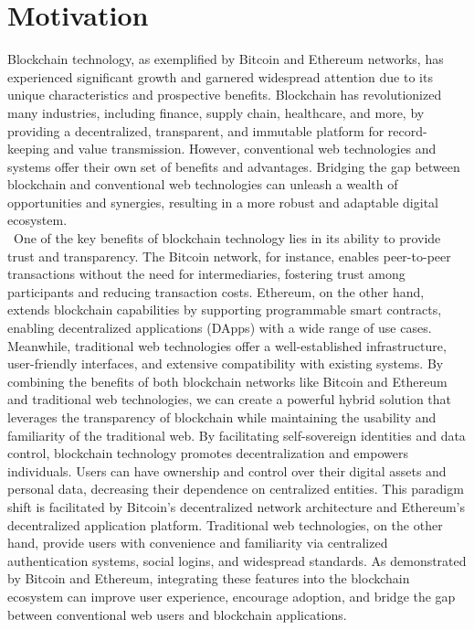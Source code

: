 \documentclass[../Main.tex]{subfiles}
\begin{document}
\section{Motivation}
\label{section:1.1}
Blockchain technology, as exemplified by Bitcoin \cite{Bitcoin} and Ethereum \cite{Ethereum} networks, has experienced significant growth and garnered widespread attention due to its unique characteristics and prospective benefits. Blockchain has revolutionized many industries, including finance, supply chain, healthcare, and more, by providing a decentralized, transparent, and immutable platform for record-keeping and value transmission. However, conventional web technologies and systems offer their own set of benefits and advantages. Bridging the gap between blockchain and conventional web technologies can unleash a wealth of opportunities and synergies, resulting in a more robust and adaptable digital ecosystem. \\\
\indent One of the key benefits of blockchain technology lies in its ability to provide trust and transparency. The Bitcoin network, for instance, enables peer-to-peer transactions without the need for intermediaries, fostering trust among participants and reducing transaction costs. Ethereum, on the other hand, extends blockchain capabilities by supporting programmable smart contracts, enabling decentralized applications (DApps) with a wide range of use cases. Meanwhile, traditional web technologies offer a well-established infrastructure, user-friendly interfaces, and extensive compatibility with existing systems. By combining the benefits of both blockchain networks like Bitcoin and Ethereum and traditional web technologies, we can create a powerful hybrid solution that leverages the transparency of blockchain while maintaining the usability and familiarity of the traditional web. By facilitating self-sovereign identities and data control, blockchain technology promotes decentralization and empowers individuals. Users can have ownership and control over their digital assets and personal data, decreasing their dependence on centralized entities. This paradigm shift is facilitated by Bitcoin's decentralized network architecture and Ethereum's decentralized application platform. Traditional web technologies, on the other hand, provide users with convenience and familiarity via centralized authentication systems, social logins, and widespread standards. As demonstrated by Bitcoin and Ethereum, integrating these features into the blockchain ecosystem can improve user experience, encourage adoption, and bridge the gap between conventional web users and blockchain applications. \\\
\end{document}
